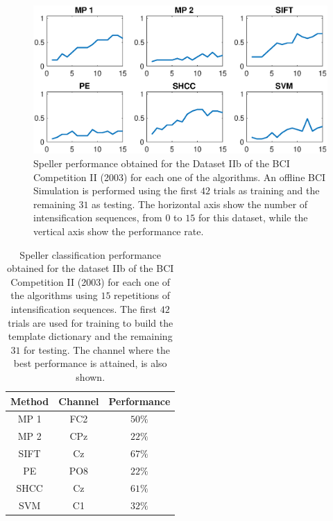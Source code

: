 \begin{figure}[h!]
\centering
\includegraphics[width=15cm]{images/PerformanceBCICompetition.eps}
\caption[Dataset IIb BCI Competition II (2003) Speller Performance]{Speller performance obtained for the Dataset IIb of the BCI Competition II (2003) for each one of the algorithms.  An offline BCI Simulation is performed using the first $42$ trials as training and the remaining $31$ as testing.  The horizontal axis show the number of intensification sequences, from $0$ to $15$ for this dataset, while the vertical axis show the performance rate.}
\label{fig:performancebcicompetition}
\end{figure}


\begin{table}[h!]
\caption[Dataset IIb BCI Competition II (2003) Speller Performance]{Speller classification performance obtained for the dataset IIb of the BCI Competition II (2003) for each one of the algorithms using $15$ repetitions of intensification sequences. The first $42$ trials are used for training to build the template dictionary and the remaining $31$ for testing. The channel where the best performance is attained, is also shown. }
\centering
\begin{tabular}{ccc}
\toprule
\textbf{Method}	& \textbf{Channel} &  \textbf{Performance} \\
\midrule
MP 1 & FC2  & $50\%$ \\
MP 2 & CPz & $22\%$ \\
SIFT  & Cz & $67\%$ \\
PE     & PO8 & $22\%$ \\
SHCC & Cz & $61\%$ \\
SVM     & C1  & $32\%$ \\
\bottomrule
\end{tabular}
\label{tab:bcicompetitionresults}
\end{table}



